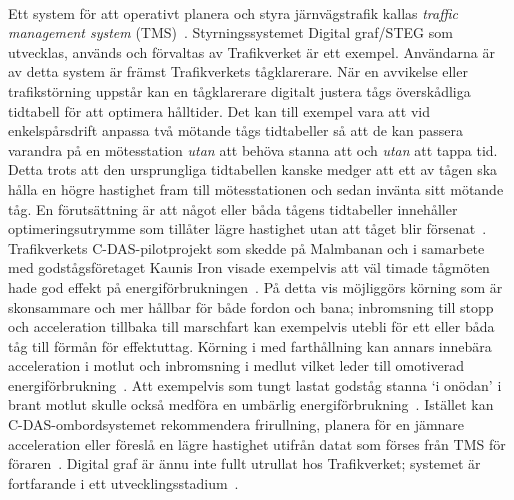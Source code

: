 \paragraph{}
\hspace{-11}Ett system för att operativt planera och styra järnvägstrafik kallas \emph{traffic management system} (TMS)~\cite{Joborn2023}.
Styrningssystemet Digital graf/STEG som utvecklas, används och förvaltas av Trafikverket är ett exempel.
Användarna är av detta system är främst Trafikverkets tågklarerare.
När en avvikelse eller trafikstörning uppstår kan en tågklarerare digitalt justera tågs överskådliga tidtabell för att optimera hålltider.
Det kan till exempel vara att vid enkelspårsdrift anpassa två mötande tågs tidtabeller så att de kan passera varandra på en mötesstation \emph{utan} att behöva stanna att och \emph{utan} att tappa tid.
Detta trots att den ursprungliga tidtabellen kanske medger att ett av tågen ska hålla en högre hastighet fram till mötesstationen och sedan invänta sitt mötande tåg.
En förutsättning är att något eller båda tågens tidtabeller innehåller optimeringsutrymme som tillåter lägre hastighet utan att tåget blir försenat~\cite{Joborn2023}.
Trafikverkets C-DAS-pilotprojekt som skedde på Malmbanan och i samarbete med godstågsföretaget Kaunis Iron visade exempelvis att väl timade tågmöten hade god effekt på energiförbrukningen~\cite{Lindmark2022}.
På detta vis möjliggörs körning som är skonsammare och mer hållbar för både fordon och bana; inbromsning till stopp och acceleration tillbaka till marschfart kan exempelvis utebli för ett eller båda tåg till förmån för effektuttag.
Körning i med farthållning kan annars innebära acceleration i motlut och inbromsning i medlut vilket leder till omotiverad energiförbrukning~\cite{Lindmark2022}.
Att exempelvis som tungt lastat godståg stanna \lq{}i onödan\rq{} i brant motlut skulle också medföra en umbärlig energiförbrukning~\cite{Lindmark2022}.
Istället kan C-DAS-ombordsystemet rekommendera frirullning, planera för en jämnare acceleration eller föreslå en lägre hastighet utifrån datat som förses från TMS för föraren~\cite{Lindmark2022}.
Digital graf är ännu inte fullt utrullat hos Trafikverket; systemet är fortfarande i ett utvecklingsstadium~\cite{Joborn2023}.
